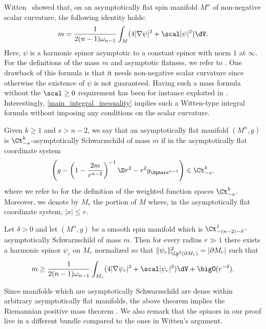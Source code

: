 \documentclass[a4paper,11pt]{amsart}
\numberwithin{equation}{section}
\begin{document}
Witten~\cite{witten1981new} showed that, on an asymptotically flat spin manifold $M^n$ of non-negative scalar curvature, the following identity holds:
\begin{align*}
    m=\frac{1}{2(n-1)\omega_{n-1}}\int_{M}(4|\nabla \psi |^2+\scal|\psi|^2)\dV.
\end{align*}
Here, $\psi$ is a harmonic spinor asymptotic to a constant spinor with norm $1$ at $\infty$.
For the definitions of the mass $m$ and asymptotic flatness, we refer to \cite{lee2021geometric}.
One drawback of this formula is that it needs non-negative scalar curvature since otherwise the existence of $\psi$ is not guaranteed. 
Having such a mass formula without the $\scal \ge0$ requirement has been for instance exploited in \cite[Theorem 1.5]{hirsch2020mass}.
Interestingly, \cref{main_integral_inequality} implies such a Witten-type integral formula without imposing any conditions on the scalar curvature.

Given $k\ge1$ and $s>n-2$, we say that an asymptotically flat manifold $(M^n,g)$ is $\Ct^{k}_{-s}$-asymptotically Schwarzschild of mass $m$ if in the asymptotically flat coordinate system
\begin{align}\label{eq AS}
  \left(g-\left(1-\frac{2m}{r^{n-2}}\right)^{-1}\D r^2-r^2g_{\Sphere^{n-1}}\right)\in \Ct^{k}_{-s},
\end{align}
where we refer to \cite{lee2021geometric} for the definition of the weighted function spaces $\Ct^{k}_{-s}$.
Moreover, we denote by $M_r$ the portion of $M$ where, in the asymptotically flat coordinate system, $|x|\le r$. 

\begin{theorem}
    Let $\delta>0$ and let $(M^n,g)$ be a smooth spin manifold which is $\Ct^{1}_{-(n-2)-\delta}$-asymptotically Schwarzschild of mass $m$.
    Then for every radius $r\gg1$ there exists a harmonic spinor $\psi_r$ on $M_r$ normalized so that $\|\psi_r\|^2_{\Lp^2(\partial M_r)} = |\partial M_r|$ such that
    \begin{align*}
         m\ge\frac{1}{2(n-1)\omega_{n-1}}\int_{M_r}(4|\nabla \psi_r|^2+\scal|\psi_r|^2) \dV+\bigO(r^{-\delta}).
    \end{align*}
\end{theorem}

Since manifolds which are asymptotically Schwarzschild are dense within arbitrary asymptotically flat manifolds, the above theorem implies the Riemannian positive mass theorem \cite[Theorem 7]{Bray1997Thesis}.
We also remark that the spinors in our proof live in a different bundle compared to the ones in Witten's argument.
\end{document}
